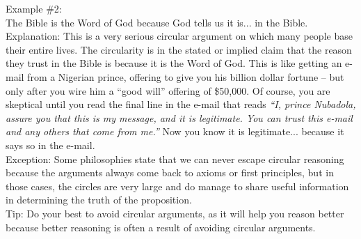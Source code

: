 \documentclass[a4paper,12pt,single,pdftex]{scrartcl}
\begin{document}
{    
      Example \#2:
    \\

    
      The Bible is the Word of God because God tells us it is... in the Bible.
    \\

    
      Explanation: This is a very serious circular argument on which many people base their entire lives. The circularity is in the stated or implied claim that the reason they trust in the Bible is because it is the Word of God.  This is like getting an e-mail from a Nigerian prince, offering to give you his billion dollar fortune -- but only after you wire him a “good will” offering of \$50,000.  Of course, you are skeptical until you read the final line in the e-mail that reads {\it “I, prince Nubadola, assure you that this is my message, and it is legitimate.  You can trust this e-mail and any others that come from me.”  }Now you know it is legitimate... because it says so in the e-mail.
    \\

    
      Exception: Some philosophies state that we can never escape circular reasoning because the arguments always come back to axioms or first principles, but in those cases, the circles are very large and do manage to share useful information in determining the truth of the proposition.
    \\

    
      Tip: Do your best to avoid circular arguments, as it will help you reason better because better reasoning is often a result of avoiding circular arguments.
    \\

  }
\end{document}
